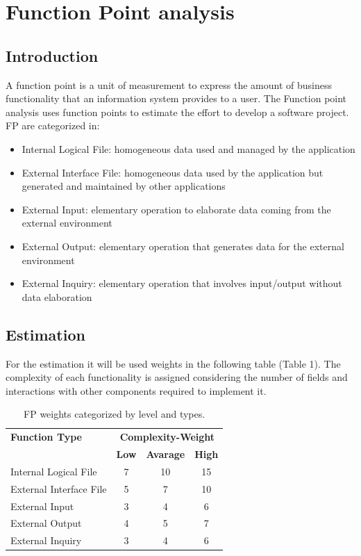 \documentclass{article}
\begin{document}
		\pagebreak
	\section{Function Point analysis}
		\subsection{Introduction}
		A function point is a unit of measurement to express the amount of business functionality that an information system provides to a user. 
		The Function point analysis uses function points to estimate the effort to develop a software project. FP are categorized in:
		\begin{itemize}
			\item Internal Logical File: homogeneous data used and managed by the application
			\item External Interface File: homogeneous data used by the application but generated and maintained by other applications
			\item External Input: elementary operation to elaborate data coming from the external environment
			\item External Output: elementary operation that generates data for the external environment
			\item External Inquiry: elementary operation that involves input/output without data elaboration
		\end{itemize}
		\subsection{Estimation}
		For the estimation it will be used weights in the following table (Table 1). The complexity of each functionality is assigned considering the number of fields and interactions with other components required to implement it.
			\begin{table}[!h]
				\centering
				\renewcommand{\arraystretch}{1.4}
				\begin{tabular}{|p{5cm}|c|c|c|}
					\hline
					\textbf{Function Type} & \multicolumn{3}{c|}{\textbf{Complexity-Weight}}\\
					\cline{2-4}
					& \textbf{Low} & \textbf{Avarage} & \textbf{High}\\
					\hline
					Internal Logical File & 7 & 10 & 15 \\ \hline
					External Interface File & 5 & 7 & 10 \\ \hline
					External Input & 3 & 4 & 6 \\ \hline
					External Output & 4 & 5 & 7 \\ \hline
					External Inquiry & 3 & 4 & 6 \\ \hline
				\end{tabular}
				\caption{ FP weights categorized by level and types.}
			\end{table}
		\pagebreak
		
\end{document}
